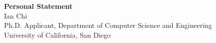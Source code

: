 \documentclass[11pt]{article}
\begin{document}
\begin{center}
    {\Large \textbf{Personal Statement}}\\[4pt]
    {\large Ian Chi}\\[2pt]
    Ph.D. Applicant, Department of Computer Science and Engineering\\
    University of California, San Diego
\end{center}

\vspace{1em}

\end{document}
